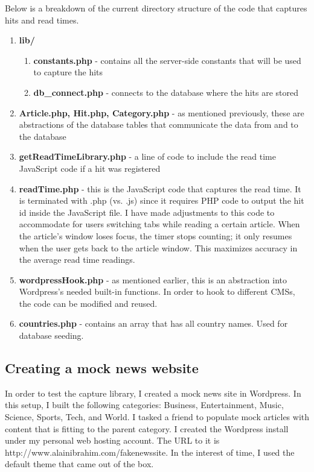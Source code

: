 \documentclass[12pt]{article}
\begin{document}
\noindent Below is a breakdown of the current directory structure of the code that captures hits and read times.
\begin{enumerate}
\item \textbf{lib/}
\begin{enumerate}
\item \textbf{constants.php} - contains all the server-side constants that will be used to capture the hits
\item \textbf{db\_connect.php} - connects to the database where the hits are stored
\end{enumerate}
\item \textbf{Article.php, Hit.php, Category.php} - as mentioned previously, these are abstractions of the database tables that communicate the data from and to the database
\item \textbf{getReadTimeLibrary.php} - a line of code to include the read time JavaScript code if a hit was registered
\item \textbf{readTime.php} - this is the JavaScript code that captures the read time. It is terminated with .php (vs. .js) since it requires PHP code to output the hit id inside the JavaScript file. I have made adjustments to this code to accommodate for users switching tabs while reading a certain article. When the article's window loses focus, the timer stops counting; it only resumes when the user gets back to the article window. This maximizes accuracy in the average read time readings.
\item \textbf{wordpressHook.php} - as mentioned earlier, this is an abstraction into Wordpress's needed built-in functions. In order to hook to different CMSs, the code can be modified and reused. 
\item \textbf{countries.php} - contains an array that has all country names. Used for database seeding.
\end{enumerate}

\newpage

\subsection{Creating a mock news website}
In order to test the capture library, I created a mock news site in Wordpress. In this setup, I built the following categories: Business, Entertainment, Music, Science, Sports, Tech, and World. I tasked a friend to populate mock articles with content that is fitting to the parent category. I created the Wordpress install under my personal web hosting account. The URL to it is http://www.alainibrahim.com/fakenewssite. In the interest of time, I used the default theme that came out of the box. \\
\end{document}
